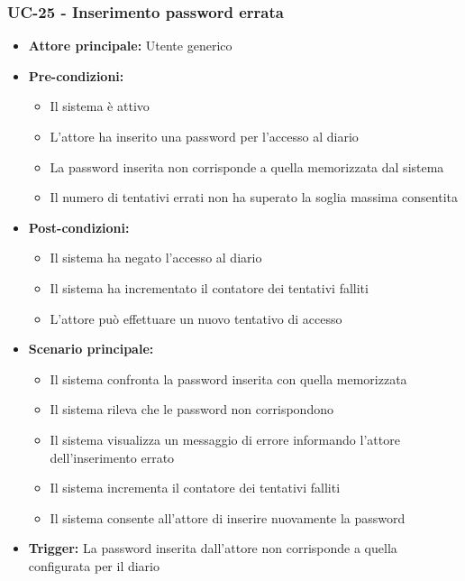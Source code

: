 \documentclass[a4paper,12pt]{article}
\begin{document}
\subsubsection{UC-25 - Inserimento password errata} \label{subsec:UC-25}
\begin{itemize}
    \item \textbf{Attore principale:} Utente generico
    \item \textbf{Pre-condizioni:}
    \begin{itemize}
        \item Il sistema è attivo
        \item L'attore ha inserito una password per l'accesso al diario
        \item La password inserita non corrisponde a quella memorizzata dal sistema
        \item Il numero di tentativi errati non ha superato la soglia massima consentita
    \end{itemize}
    \item \textbf{Post-condizioni:} 
    \begin{itemize}
        \item Il sistema ha negato l'accesso al diario
        \item Il sistema ha incrementato il contatore dei tentativi falliti
        \item L'attore può effettuare un nuovo tentativo di accesso
    \end{itemize}
    \item \textbf{Scenario principale:} 
    \begin{itemize}
        \item Il sistema confronta la password inserita con quella memorizzata
        \item Il sistema rileva che le password non corrispondono
        \item Il sistema visualizza un messaggio di errore informando l'attore dell'inserimento errato
        \item Il sistema incrementa il contatore dei tentativi falliti
        \item Il sistema consente all'attore di inserire nuovamente la password
    \end{itemize}
    \item \textbf{Trigger:} La password inserita dall'attore non corrisponde a quella configurata per il diario
\end{itemize}
\end{document}

